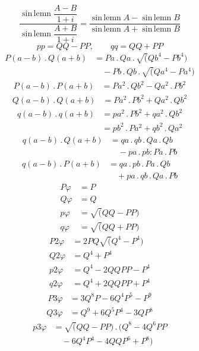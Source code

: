 \[
\dfrac{\operatorname{sin\,lemn}\dfrac{A-B}{1+i}}
{\operatorname{sin\,lemn}\dfrac{A+B}{1+i}}
=\dfrac{\operatorname{sin\,lemn}A-\operatorname{sin\,lemn}B}
{\operatorname{sin\,lemn}A+\operatorname{sin\,lemn}B}
\]
\[
pp=QQ-PP,\qquad qq=QQ+PP
\]
\[
\begin{aligned}P(a-b)\, .\,Q(a+b)&=Pa\, .\,Qa\, .\,\surd(Qb^4-Pb^4)\\[5pt]&\quad{}-Pb\, .\,Qb\, .\,\surd(Qa^4-Pa^4)\end{aligned}
\]
\[
\begin{aligned}P(a-b)\, .\,P(a+b)&=Pa^2\, .\,Qb^2-Qa^2\, .\,Pb^2\end{aligned}
\]
\[
\begin{aligned}Q(a-b)\, .\,Q(a+b)&=Pa^2\, .\,Pb^2+Qa^2\, .\,Qb^2\end{aligned}
\]
\[
\begin{aligned}
q(a-b)\, .\,q(a+b)&=pa^2\, .\,Pb^2+qa^2\, .\,Qb^2\\
&=pb^2\, .\,Pa^2+qb^2\, .\,Qa^2
\end{aligned}
\]
\[
\begin{aligned}q(a-b)\, .\,Q(a+b)&=qa\, .\,qb\, .\,Qa\, .\,Qb\\[5pt]&\quad{}-pa\, .\,pb:Pa\, .\,Pb\end{aligned}
\]
\[
\begin{aligned}q(a-b)\, .\,P(a+b)&=qa\, .\,pb\, .\,Pa\, .\,Qb\\[5pt]&\quad{}+pa\, .\,qb\, .\,Qa\, .\,Pb\end{aligned}
\]
\[
\begin{aligned}
P\varphi&=P\\[4pt]
Q\varphi&=Q\\[4pt]
p\varphi&=\surd(QQ-PP)\\[4pt]
q\varphi&=\surd(QQ+PP)
\end{aligned}
\]
\[
\begin{aligned}
P2\varphi&=2PQ\surd(Q^4-P^4)\\[4pt]
Q2\varphi&=Q^4+P^4\\[4pt]
p2\varphi&=Q^4-2QQPP-P^4\\[4pt]
q2\varphi&=Q^4+2QQPP+P^4
\end{aligned}
\]
\[
\begin{aligned}P3\varphi&=3Q^8P-6Q^4P^5-P^9\end{aligned}
\]
\[
\begin{aligned}Q3\varphi&=Q^9+6Q^5P^4-3QP^8\end{aligned}
\]
\[
\begin{aligned}p3\varphi&=\surd(QQ-PP)\, .\,(Q^8-4Q^6PP\\[5pt]&\quad{}-6Q^4P^4-4QQP^6+P^8)\end{aligned}
\]
